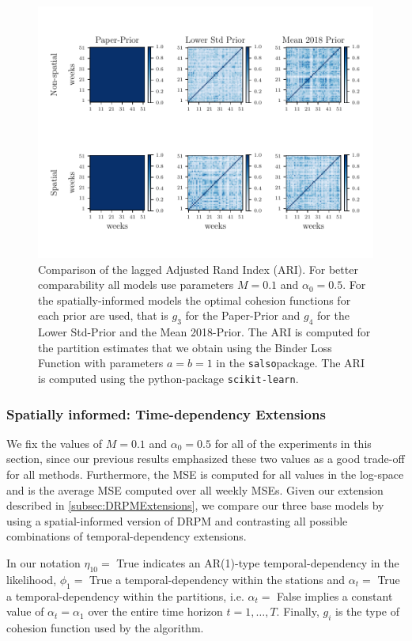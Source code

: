 \documentclass[12pt,a4paper]{article}
\newcommand*{\salso}{\texttt{salso}}
\newcommand*{\skilearn}{\texttt{scikit-learn}}
\begin{document}
\begin{figure}
    \centering
    \includegraphics[width=.95\linewidth]{./imgs/drpm/drpm_laggedARI.pdf}
    \caption{Comparison of the lagged Adjusted Rand Index (ARI). For better comparability all models use parameters $M=0.1$ and $\alpha_0=0.5$. For the spatially-informed models the optimal cohesion functions for each prior are used, that is $g_3$ for the Paper-Prior and $g_4$ for the Lower Std-Prior and the Mean 2018-Prior. The ARI is computed for the partition estimates that we obtain using the Binder Loss Function with parameters $a=b=1$ in the \salso package. The ARI is computed using the python-package \skilearn .}
    \label{fig:drpm_laggedARI_nonspatial_spatial}
\end{figure}

\subsubsection{Spatially informed: Time-dependency Extensions}
We fix the values of $M= 0.1$ and $\alpha_0 = 0.5$ for all of the experiments in this section, since our previous results emphasized
these two values as a good trade-off for all methods. Furthermore, the MSE is computed for all values in the log-space and is the
average MSE computed over all weekly MSEs. Given our
extension described in \cref{subsec:DRPMExtensions}, we compare our three base models by using a spatial-informed version of
DRPM and contrasting all possible combinations of temporal-dependency extensions.

In our notation $\eta_{10} =$ True indicates an AR(1)-type temporal-dependency in the likelihood,
$\phi_1 =$ True a temporal-dependency within the stations and $\alpha_t = $ True a temporal-dependency within
the partitions, i.e. $\alpha_t = $ False implies a constant value of $\alpha_t = \alpha_1$ over the entire time horizon
$t = 1, \ldots, T$. Finally, $g_i$ is the type of cohesion function used by the algorithm.
\end{document}
